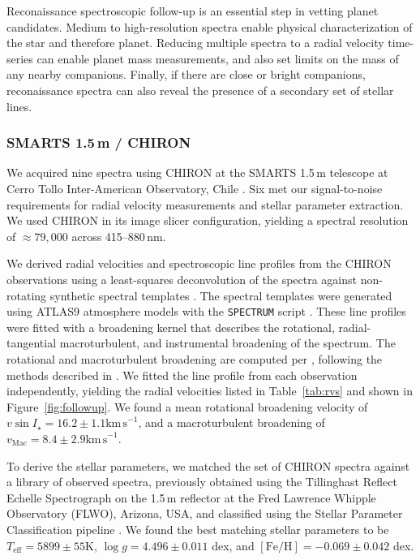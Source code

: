 \documentclass[12pt,twocolumn,tighten]{aastex63}
\begin{document}
Reconaissance spectroscopic follow-up is an essential step in vetting
planet candidates.  Medium to high-resolution spectra enable physical
characterization of the star and therefore planet.  Reducing multiple
spectra to a radial velocity time-series can enable planet mass
measurements, and also set limits on the mass of any nearby
companions.  Finally, if there are close or bright companions,
reconaissance spectra can also reveal the presence of a secondary set
of stellar lines.

\subsubsection{SMARTS 1.5$\,$m / CHIRON}
\label{subsec:chiron}

We acquired nine spectra using CHIRON at the SMARTS 1.5$\,$m telescope at
Cerro Tollo Inter-American Observatory, Chile
\citep{tokovinin_chironfiber_2013}.  Six met our signal-to-noise
requirements for radial velocity measurements and stellar parameter
extraction.  We used CHIRON in its image slicer configuration,
yielding a spectral resolution of $\approx 79{,}000$ across
415--880$\,$nm.

We derived radial velocities and spectroscopic line profiles from the
CHIRON observations using a least-squares deconvolution of the spectra
against non-rotating synthetic spectral templates
\citep{donati_1997_spectropolarimetric}. The spectral templates were
generated using ATLAS9 atmosphere models \citep{Castelli:2004} with
the \texttt{SPECTRUM} script \citep{gray_1994_spectrum}. These line
profiles were fitted with a broadening kernel that describes the
rotational, radial-tangential macroturbulent, and instrumental
broadening of the spectrum. The rotational and macroturbulent
broadening are computed per \citet{gray_2005_book}, following the
methods described in \citet{zhou_2018_hd106315obliq}. We fitted the
line profile from each observation independently, yielding the radial
velocities listed in Table~\ref{tab:rvs} and shown in
Figure~\ref{fig:followup}. We found a mean rotational broadening
velocity of $v\sin I_\star = 16.2 \pm 1.1 \mathrm{km\,s}^{-1}$, and a
macroturbulent broadening of $v_\mathrm{Mac} = 8.4 \pm 2.9
\mathrm{km\,s}^{-1}$.

To derive the stellar parameters, we matched the set of CHIRON spectra
against a library of observed spectra, previously
obtained using the Tillinghast Reflect Echelle Spectrograph
\citep[TRES,][]{furesz_tres_2008} on the 1.5\,m reflector at the Fred
Lawrence Whipple Observatory (FLWO), Arizona, USA, and classified using
the Stellar Parameter Classification pipeline
\citep{buchhave_hatp16b_class_2010}.  We found the best matching
stellar parameters to be $T_\mathrm{eff} = 5899 \pm 55$K, $\log g =
4.496 \pm 0.011$ dex, and $\mathrm{[Fe/H]} = -0.069 \pm 0.042$ dex.
\end{document}
